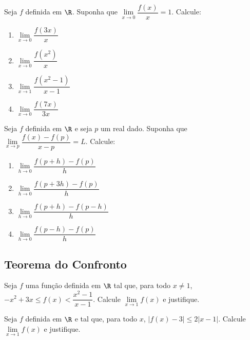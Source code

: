 \begin{exercicio}[2]
Seja $f$ definida em $\R$. Suponha que $\lim\limits_{x \to 0} \dfrac{f(x)}{x} = 1$. Calcule:
\begin{enumerate}[label=\alph*)]
    \item $\lim\limits_{x \to 0} \dfrac{f(3x)}{x}$
    \item $\lim\limits_{x \to 0} \dfrac{f(x^2)}{x}$
    \item $\lim\limits_{x \to 1} \dfrac{f(x^2 - 1)}{x - 1}$
    \item $\lim\limits_{x \to 0} \dfrac{f(7x)}{3x}$
\end{enumerate}
\end{exercicio}

\begin{exercicio}[3]
Seja $f$ definida em $\R$ e seja $p$ um real dado. Suponha que $\lim\limits_{x \to p} \dfrac{f(x) - f(p)}{x - p} = L$. Calcule:
\begin{enumerate}[label=\alph*)]
    \item $\lim\limits_{h \to 0} \dfrac{f(p + h) - f(p)}{h}$
    \item $\lim\limits_{h \to 0} \dfrac{f(p + 3h) - f(p)}{h}$
    \item $\lim\limits_{h \to 0} \dfrac{f(p + h) - f(p - h)}{h}$
    \item $\lim\limits_{h \to 0} \dfrac{f(p - h) - f(p)}{h}$
\end{enumerate}
\end{exercicio}

\clearpage

\subsection{Teorema do Confronto}

\begin{exercicio}[1]
Seja $f$ uma função definida em $\R$ tal que, para todo $x \neq 1$, $-x^2 + 3x \le f(x) < \dfrac{x^2 - 1}{x - 1}$. Calcule $\lim\limits_{x \to 1} f(x)$ e justifique.
\end{exercicio}

\begin{exercicio}[2]
Seja $f$ definida em $\R$ e tal que, para todo $x$, $|f(x) - 3| \le 2|x - 1|$. Calcule $\lim\limits_{x \to 1} f(x)$ e justifique.
\end{exercicio}

